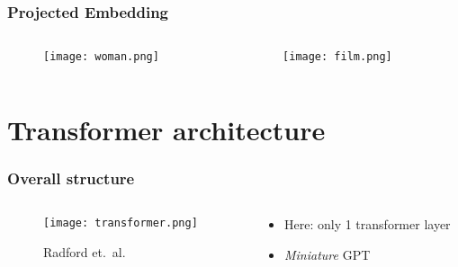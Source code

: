 \documentclass[17pt,institute=e10]{tuhh_presentation}
\begin{document}
\begin{frame}
  \frametitle{Projected Embedding}
\vspace{-1cm}
  \begin{columns}[c]
    \begin{column}{.35\textwidth}
    \begin{figure}
        \texttt{[image: woman.png]}
    \end{figure}      
    \end{column}
    \begin{column}{.35\textwidth}
    \begin{figure}
        \texttt{[image: film.png]}
    \end{figure}
    \end{column}
\end{columns}

\end{frame}

\section{Transformer architecture}

\begin{frame}
  \frametitle{Overall structure}
  \vspace{-1cm}
  \begin{columns}[c]
    \begin{column}{.4\textwidth}
    \begin{figure}
    \centering
    \texttt{[image: transformer.png]}
    \caption{Radford et.\ al.}
  \end{figure}
    \end{column}
    \pause
    \begin{column}{.5\textwidth}
      \begin{itemize}
      \item Here: only 1 transformer layer
      \item \emph{Miniature} GPT
      \end{itemize}
    \end{column}
\end{columns}
\end{frame}
\end{document}
